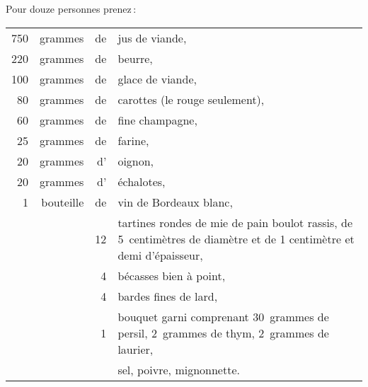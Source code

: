 \begin{center}
\small{}
\end{center}

Pour douze personnes prenez :

\footnotesize
\begin{longtable}{rrrp{16em}}
    750 & grammes & de & jus de viande,                                                                   \\
    220 & grammes & de & beurre,                                                                          \\
    100 & grammes & de & glace de viande,                                                                 \\
     80 & grammes & de & carottes (le rouge seulement),                                                   \\
     60 & grammes & de & fine champagne,                                                                  \\
     25 & grammes & de & farine,                                                                          \\
     20 & grammes & d' & oignon,                                                                          \\
     20 & grammes & d' & échalotes,                                                                       \\
    1 & bouteille & de & vin de Bordeaux blanc,                                                           \\
        &         & 12 & tartines rondes de mie de pain boulot rassis, de 5 centimètres
                         de diamètre et de 1 centimètre et demi d'épaisseur,                              \\
        &         &  4 & bécasses bien à point,                                                           \\
        &         &  4 & bardes fines de lard,                                                            \\
        &         &  1 & bouquet garni comprenant 30 grammes de persil,
                         2 grammes de thym, 2 gram\-mes de laurier,                                       \\
        &         &    & sel, poivre, mignonnette.                                                        \\
\end{longtable}
\normalsize

